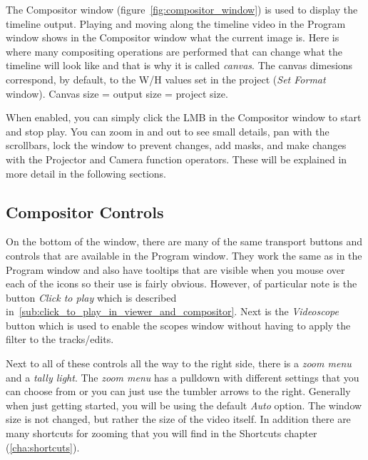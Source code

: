 The Compositor window (figure~\ref{fig:compositor_window}) is used to display the timeline output.  Playing and moving along the timeline video in the Program window shows in the Compositor window what the current image is.  Here is where many compositing operations are performed that can change what the timeline will look like and that is why it is called \textit{canvas}. The canvas dimesions correspond, by default, to the W/H values set in the project (\textit{Set Format} window). Canvas size = output size = project size.

When enabled, you can simply click the LMB in the Compositor window to start and stop play. You can zoom in and out to see small details, pan with the scrollbars, lock the window to prevent changes, add masks, and make changes with the Projector and Camera function operators. These will be explained in more detail in the following sections.

\subsection{Compositor Controls}%
\label{sub:compositor_controls}

On the bottom of the window, there are many
of the same transport buttons  and controls that are available in the Program window.
They work the same as in the Program window and also have tooltips that are visible 
when you mouse over each of the icons so their use is fairly obvious.  However,
of particular note is the button \textit{Click to play}  which is described in~\ref{sub:click_to_play_in_viewer_and_compositor}.  Next is the \textit{Videoscope}  button which is used to enable the scopes window
without having to apply the filter to the tracks/edits.

Next to all of these controls all the way to the right side, there is a \textit{zoom menu}  and a \textit{tally light}.  The \textit{zoom menu} has a pulldown with different settings that you can choose from
or you can just use the tumbler arrows to the right. Generally when just getting started, you
will be using the default \textit{Auto} option.  The window size is not changed, but rather
the size of the video itself. In addition there are many shortcuts for zooming that you
will find in the Shortcuts chapter (\ref{cha:shortcuts}).

